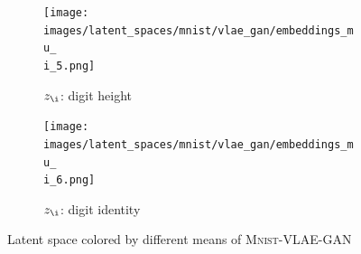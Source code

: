 \begin{landscape}
\begin{figure}[H]
{        \hfill
        \begin{adjustbox}{valign=T}
            \begin{subfigure}{.19\textwidth}
                \texttt{[image: images/latent\_spaces/mnist/vlae\_gan/embeddings\_mu\_\\i\_5.png]}
                \caption{$z_{\i}$: digit height}
            \end{subfigure}
        \end{adjustbox}
        \hfill
        \begin{adjustbox}{valign=T}
            \begin{subfigure}{.19\textwidth}
                \texttt{[image: images/latent\_spaces/mnist/vlae\_gan/embeddings\_mu\_\\i\_6.png]}
                \caption{$z_{\i}$: digit identity}
            \end{subfigure}
        \end{adjustbox}}
        \caption[\textsc{Mnist}-VLAE-GAN - Latent Space]{Latent space colored by different means of \textsc{Mnist}-\ac{VLAE}-\ac{GAN}}
        \label{fig:vlae_gan_latent_space_mnist}
    \end{figure}
\end{landscape}

